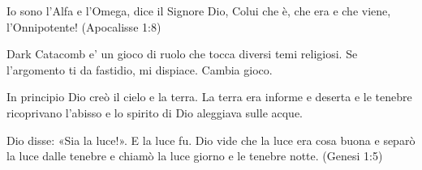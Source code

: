 \documentclass[a4paper,twoside,openany]{book}
\begin{document}
\pagebreak

\begin{center}
{\LARGE Io sono l'Alfa e l'Omega, dice il Signore Dio, Colui che è, che era e che viene, l'Onnipotente!} {\normalsize (Apocalisse 1:8)}
\end{center}


\vfill

Dark Catacomb e' un gioco di ruolo che tocca diversi temi religiosi. Se l'argomento ti da fastidio, mi dispiace. Cambia gioco.

\pagebreak

\setcounter{page}{1}

\begin{multicols}{2}
{\small \tableofcontents{}}

\end{multicols}

\vfill

\begin{changemargin}{0.3cm}{0.3cm}\begin{tcolorbox}
In principio Dio creò il cielo e la terra. La terra era informe e deserta e le tenebre ricoprivano l'abisso e lo spirito di Dio aleggiava sulle acque.

Dio disse: «Sia la luce!». E la luce fu. Dio vide che la luce era cosa buona e separò la luce dalle tenebre e chiamò la luce giorno e le tenebre notte. (Genesi 1:5)
\end{tcolorbox}\end{changemargin}

\pagebreak





\end{document}

